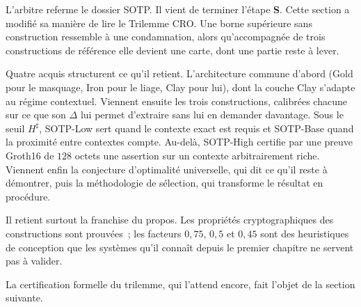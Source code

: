 \begin{boiteArbitre}
L'arbitre referme le dossier SOTP. Il vient de terminer l'\'etape \textbf{S}. 
Cette section a modifi\'e sa mani\`ere de lire le Trilemme CRO. Une borne sup\'erieure
sans construction ressemble \`a une condamnation, alors qu'accompagn\'ee de trois constructions de
r\'ef\'erence elle devient une carte, dont une partie reste \`a lever.

Quatre acquis structurent ce qu'il retient. L'architecture commune
d'abord (Gold pour le masquage, Iron pour le liage, Clay pour lui), dont
la couche Clay s'adapte au r\'egime contextuel. Viennent ensuite les trois constructions,
calibr\'ees chacune sur ce que son $\Delta$ lui permet d'extraire
sans lui en demander davantage. Sous le seuil $H^\sharp$, SOTP-Low sert quand le contexte
exact est requis et SOTP-Base quand la proximit\'e entre contextes compte. Au-del\`a, SOTP-High
certifie par une preuve Groth16 de $128$ octets une assertion sur un
contexte arbitrairement riche. Viennent enfin la conjecture d'optimalit\'e universelle, qui
dit ce qu'il reste \`a d\'emontrer, puis la m\'ethodologie de s\'election, qui
transforme le r\'esultat en proc\'edure.

Il retient surtout la franchise du propos. Les propri\'et\'es cryptographiques des
constructions sont prouv\'ees~; les facteurs $0{,}75$, $0{,}5$ et $0{,}45$ sont des
heuristiques de conception que les syst\`emes qu'il conna\^it depuis le premier
chapitre ne servent pas \`a valider.

La certification formelle du trilemme, qui l'attend encore, fait l'objet de la section suivante.
\end{boiteArbitre}